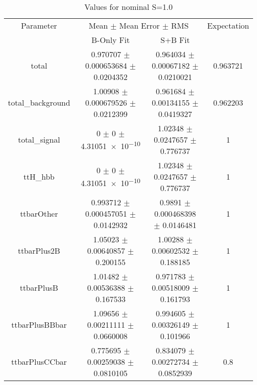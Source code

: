 \begin{table}
\centering
\caption{Values for nominal S=1.0}
\begin{tabular}{cccc}
\toprule
Parameter & \multicolumn{2}{c}{Mean $\pm$ Mean Error $\pm$ RMS} & Expectation\\
 & B-Only Fit & S+B Fit & \\
\midrule
total & \num{0.970707} $\pm$ \num{0.000653684} $\pm$ \num{0.0204352} & \num{0.964034} $\pm$ \num{0.00067182} $\pm$ \num{0.0210021} & \num{0.963721}\\
total\_background & \num{1.00908} $\pm$ \num{0.000679526} $\pm$ \num{0.0212399} & \num{0.961684} $\pm$ \num{0.00134155} $\pm$ \num{0.0419327} & \num{0.962203}\\
total\_signal & \num{0} $\pm$ \num{0} $\pm$ \num{4.31051e-10} & \num{1.02348} $\pm$ \num{0.0247657} $\pm$ \num{0.776737} & \num{1}\\
ttH\_hbb & \num{0} $\pm$ \num{0} $\pm$ \num{4.31051e-10} & \num{1.02348} $\pm$ \num{0.0247657} $\pm$ \num{0.776737} & \num{1}\\
ttbarOther & \num{0.993712} $\pm$ \num{0.000457051} $\pm$ \num{0.0142932} & \num{0.9891} $\pm$ \num{0.000468398} $\pm$ \num{0.0146481} & \num{1}\\
ttbarPlus2B & \num{1.05023} $\pm$ \num{0.00640857} $\pm$ \num{0.200155} & \num{1.00288} $\pm$ \num{0.00602532} $\pm$ \num{0.188185} & \num{1}\\
ttbarPlusB & \num{1.01482} $\pm$ \num{0.00536388} $\pm$ \num{0.167533} & \num{0.971783} $\pm$ \num{0.00518009} $\pm$ \num{0.161793} & \num{1}\\
ttbarPlusBBbar & \num{1.09656} $\pm$ \num{0.00211111} $\pm$ \num{0.0660008} & \num{0.994605} $\pm$ \num{0.00326149} $\pm$ \num{0.101966} & \num{1}\\
ttbarPlusCCbar & \num{0.775695} $\pm$ \num{0.00259038} $\pm$ \num{0.0810105} & \num{0.834079} $\pm$ \num{0.00272734} $\pm$ \num{0.0852939} & \num{0.8}\\
\bottomrule
\end{tabular}
\end{table}
